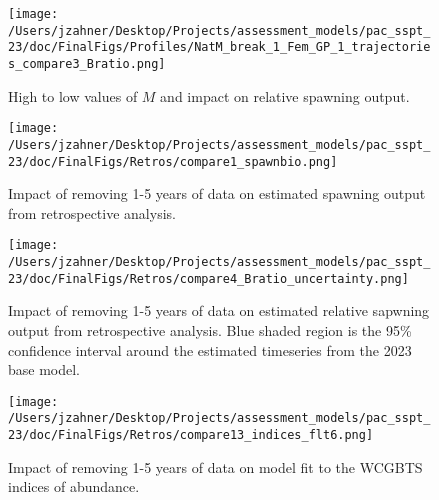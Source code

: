\documentclass[11pt,
  letterpaper,
]{article}
\begin{document}
\begin{figure}
{\centering
\texttt{[image: /Users/jzahner/Desktop/Projects/assessment\_models/pac\_sspt\_23/doc/FinalFigs/Profiles/NatM\_break\_1\_Fem\_GP\_1\_trajectories\_compare3\_Bratio.png]}
}
\caption{High to low values of $M$ and impact on relative spawning output.\label{fig:M_relspawnout}}
\end{figure}

\clearpage

\begin{figure}
{\centering
\texttt{[image: /Users/jzahner/Desktop/Projects/assessment\_models/pac\_sspt\_23/doc/FinalFigs/Retros/compare1\_spawnbio.png]}
}
\caption{Impact of removing 1-5 years of data on estimated spawning output from retrospective analysis.\label{fig:retros_spawnbio}}
\end{figure}

\begin{figure}
{\centering
\texttt{[image: /Users/jzahner/Desktop/Projects/assessment\_models/pac\_sspt\_23/doc/FinalFigs/Retros/compare4\_Bratio\_uncertainty.png]}
}
\caption{Impact of removing 1-5 years of data on estimated relative sapwning output from retrospective analysis. Blue shaded region is the 95\% confidence interval around the estimated timeseries from the 2023 base model.\label{fig:retros_bratio_uncertainty}}
\end{figure}

\begin{figure}
{\centering
\texttt{[image: /Users/jzahner/Desktop/Projects/assessment\_models/pac\_sspt\_23/doc/FinalFigs/Retros/compare13\_indices\_flt6.png]}
}
\caption{Impact of removing 1-5 years of data on model fit to the WCGBTS indices of abundance.\label{fig:retros_indices}}
\end{figure}
\end{document}
